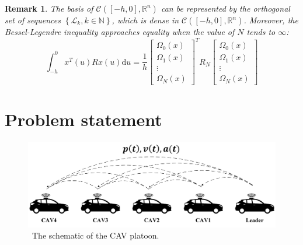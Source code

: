 \documentclass[a4paper]{cas-sc}
\newtheorem{remark}[theorem]{Remark}
\begin{document}
\begin{remark}
  The basis of $\mathcal{C}\left( {\left[ { - h,0} \right],{\mathbb{R}^n}} \right)$ can be represented by the orthogonal set of sequences $\left\{ {{\mathcal{L}_k},k \in \mathbb{N}} \right\}$, which is dense in $\mathcal{C}\left( {\left[ { - h,0} \right],{\mathbb{R}^n}} \right)$. Moreover, the Bessel-Legendre inequality approaches equality when the value of $N$ tends to $\infty$:
  \begin{equation}
    \int_{ - h}^0 {{x^T}} (u)Rx(u){\text{d}}u = \frac{1}{h}{\left[ {\begin{array}{*{20}{c}}
              {{\Omega _0}(x)} \\
              {{\Omega _1}(x)} \\
              \vdots           \\
              {{\Omega _N}(x)}
            \end{array}} \right]^T}{R_N}\left[ {\begin{array}{*{20}{c}}
            {{\Omega _0}(x)} \\
            {{\Omega _1}(x)} \\
            \vdots           \\
            {{\Omega _N}(x)}
          \end{array}} \right]
  \end{equation}
\end{remark}




\section{Problem statement}
\label{Section 3}

\begin{figure}
  \centering
  \includegraphics[width=14cm]{figs/fig1.png}
  \caption{~The schematic of the CAV platoon.}
  \label{fig1}
\end{figure}
\end{document}
